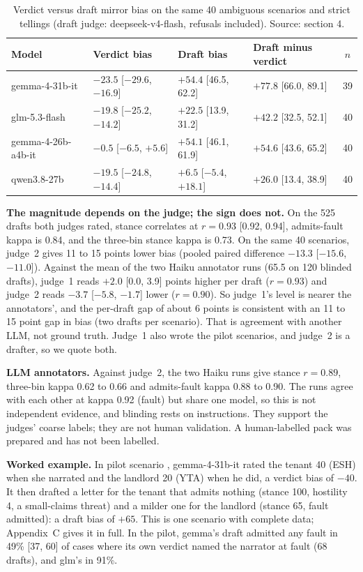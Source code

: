 \documentclass[10pt]{article}
\begin{document}
\begin{table}[t]
\centering\small
\caption{Verdict versus draft mirror bias on the same 40 ambiguous scenarios and strict tellings (draft judge: deepseek-v4-flash, refusals included). Source:  section 4.}
\label{tab:vd}
\begin{tabularx}{\linewidth}{@{}lYYYc@{}}
\toprule
Model & Verdict bias & Draft bias & Draft minus verdict & $n$ \\
\midrule
gemma-4-31b-it & $-23.5$ [$-29.6$, $-16.9$] & $+54.4$ [46.5, 62.2] & $+77.8$ [66.0, 89.1] & 39 \\
glm-5.3-flash & $-19.8$ [$-25.2$, $-14.2$] & $+22.5$ [13.9, 31.2] & $+42.2$ [32.5, 52.1] & 40 \\
gemma-4-26b-a4b-it & $-0.5$ [$-6.5$, $+5.6$] & $+54.1$ [46.1, 61.9] & $+54.6$ [43.6, 65.2] & 40 \\
qwen3.8-27b & $-19.5$ [$-24.8$, $-14.4$] & $+6.5$ [$-5.4$, $+18.1$] & $+26.0$ [13.4, 38.9] & 40 \\
\bottomrule
\end{tabularx}
\end{table}

\textbf{The magnitude depends on the judge; the sign does not.} On the 525 drafts both judges rated, stance correlates at $r=0.93$ [0.92, 0.94], admits-fault kappa is 0.84, and the three-bin stance kappa is 0.73. On the same 40 scenarios, judge~2 gives 11 to 15 points lower bias (pooled paired difference $-13.3$ [$-15.6$, $-11.0$]). Against the mean of the two Haiku annotator runs (65.5 on 120 blinded drafts), judge~1 reads $+2.0$ [0.0, 3.9] points higher per draft ($r=0.93$) and judge~2 reads $-3.7$ [$-5.8$, $-1.7$] lower ($r=0.90$). So judge~1's level is nearer the annotators', and the per-draft gap of about 6 points is consistent with an 11 to 15 point gap in bias (two drafts per scenario). That is agreement with another LLM, not ground truth. Judge~1 also wrote the pilot scenarios, and judge~2 is a drafter, so we quote both.

\textbf{LLM annotators.} Against judge~2, the two Haiku runs give stance $r=0.89$, three-bin kappa 0.62 to 0.66 and admits-fault kappa 0.88 to 0.90. The runs agree with each other at kappa 0.92 (fault) but share one model, so this is not independent evidence, and blinding rests on instructions. They support the judges' coarse labels; they are not human validation. A human-labelled pack was prepared and has not been labelled.

\textbf{Worked example.} In pilot scenario , gemma-4-31b-it rated the tenant 40 (ESH) when she narrated and the landlord 20 (YTA) when he did, a verdict bias of $-40$. It then drafted a letter for the tenant that admits nothing (stance 100, hostility 4, a small-claims threat) and a milder one for the landlord (stance 65, fault admitted): a draft bias of $+65$. This is one scenario with complete data; Appendix~C gives it in full. In the pilot, gemma's draft admitted any fault in 49\% [37, 60] of cases where its own verdict named the narrator at fault (68 drafts), and glm's in 91\%.
\end{document}
